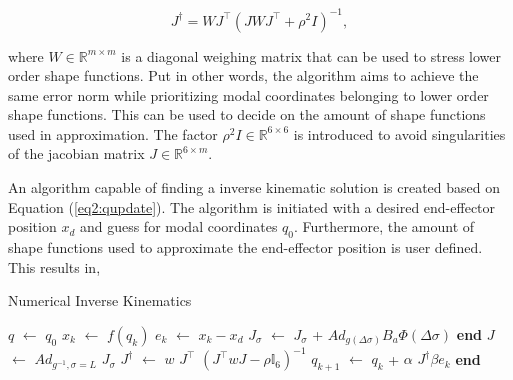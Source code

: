 \begin{equation}
    J^\dagger = WJ^\top(JWJ^\top + \rho^2 I)^{-1}
    \label{eq2:pseudoinverse},
\end{equation}

where $W \in \mathbb{R}^{m\times m}$ is a diagonal weighing matrix that can be used to stress lower order shape functions. Put in other words, the algorithm aims to achieve the same error norm while prioritizing modal coordinates belonging to lower order shape functions. This can be used to decide on the amount of shape functions used in approximation. The factor $\rho^2 I \in \mathbb{R}^{6 \times 6}$ is introduced to avoid singularities of the jacobian matrix $J \in \mathbb{R}^{6 \times m}$. 

An algorithm capable of finding a inverse kinematic solution is created based on Equation (\ref{eq2:qupdate}). The algorithm is initiated with a desired end-effector position $x_d$ and guess for modal coordinates $q_0$. Furthermore, the amount of shape functions used to approximate the end-effector position is user defined. This results in,


\begin{algorithm}[H]
\caption{Numerical Inverse Kinematics}
\begin{algorithmic}[1]
\State $q$ $\leftarrow$ $q_0$ 
      
    \State $x_k$ $\leftarrow$ $f(q_k)$  
     \State $e_k$ $\leftarrow$ $x_k - x_d$ 
            \State $J_{\sigma}$ $\leftarrow$  $J_{\sigma}$ + $Ad_{g(\Delta \sigma)} B_a \Phi(\Delta \sigma)$ 
        \EndFor
    \State \textbf{end}
    \State $J$ $\leftarrow$ $Ad_{g^{-1},\sigma=L}$ $J_{\sigma}$ 
    \State $J^{\dagger}$ $\leftarrow$  $w$ $J^{\top}$ $(J^\top w J - \rho \mathbb{I}_6)^{-1}$ 
    \State $q_{k+1}$  $\leftarrow$ $q_{k}$ + $\alpha$ $J^{\dagger} \beta e_k$ 
\EndWhile 
\State \textbf{end}
    \label{alg2:numericalinverse}
\end{algorithmic}
\end{algorithm}


